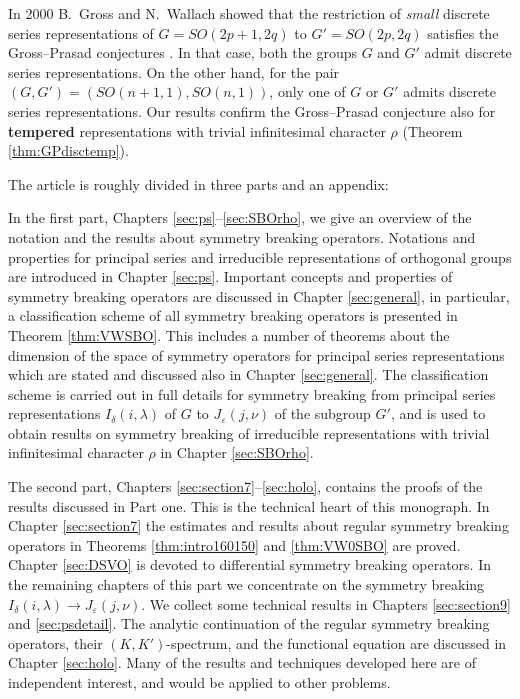 In 2000 B.~Gross and N.~Wallach \cite{GW} showed
 that the restriction of {\it{small}} discrete series representations
 of $G=SO(2p+1,2q)$ to $G'=SO(2p,2q)$ 
satisfies the Gross--Prasad conjectures
 \cite{GP}. 
In that case,
 both the groups $G$ and $G'$ admit discrete series representations.  
On the other hand,
 for the pair $(G,G')=(SO(n+1,1),SO(n,1))$, 
 only one of $G$ or $G'$ admits discrete series representations.  
Our results confirm the Gross--Prasad conjecture
 also for {\bf tempered} representations
 with trivial infinitesimal character $\rho$
 (Theorem \ref{thm:GPdisctemp}). 



\bigskip \noindent
The article is roughly divided in three parts and an appendix: 



In the first part, 
 Chapters \ref{sec:ps}--\ref{sec:SBOrho}, 
 we give an overview of the notation
 and the results about symmetry breaking operators.  
Notations and properties for principal series and irreducible representations of orthogonal groups are introduced in Chapter \ref{sec:ps}. 
Important concepts and properties of symmetry breaking operators are discussed 
 in Chapter \ref{sec:general}, 
 in particular,
 a classification scheme of all symmetry breaking operators
 is presented in Theorem \ref{thm:VWSBO}.  
This includes a number of theorems about the dimension
 of the space of symmetry operators for principal series representations
 which are stated and discussed also in Chapter \ref{sec:general}. 
The classification scheme is carried out
 in full details for symmetry breaking from principal series representations
 $I_\delta(i,\lambda)$ of $G$ to $J_\varepsilon(j,\nu)$
 of the subgroup $G'$, 
 and is used to obtain results on symmetry breaking of 
 irreducible representations with trivial infinitesimal character $\rho $
 in Chapter \ref{sec:SBOrho}. 



The second part,
 Chapters \ref{sec:section7}--\ref{sec:holo},
 contains the proofs of the results discussed in Part one. 
This is the technical heart of this monograph.  
In Chapter \ref{sec:section7} the estimates and results about regular symmetry breaking operators in Theorems \ref{thm:intro160150} and \ref{thm:VW0SBO}
 are proved. 
Chapter \ref{sec:DSVO} is devoted to differential symmetry breaking operators. 
In the remaining chapters of this part we concentrate on the symmetry breaking  $I_\delta(i,\lambda) \rightarrow J_\varepsilon(j,\nu )$. 
We collect some technical results
 in Chapters \ref{sec:section9} and \ref{sec:psdetail}.  
The analytic continuation of the regular symmetry breaking operators, 
 their $(K,K')$-spectrum, 
 and the functional equation are discussed in Chapter \ref{sec:holo}.
Many of the results and techniques developed here are of independent interest, 
 and would be applied to other problems.  



